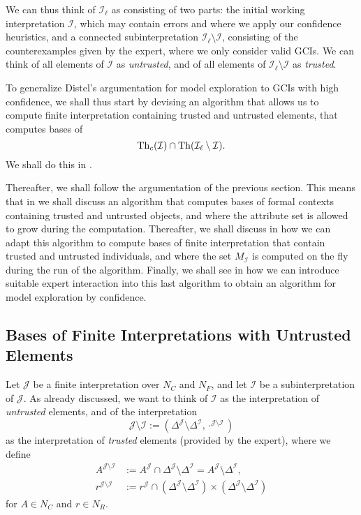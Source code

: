 We can thus think of $\mathcal{I}_{\ell}$ as consisting of two parts: the initial working
interpretation $\mathcal{I}$, which may contain errors and where we apply our confidence
heuristics, and a connected subinterpretation $\mathcal{I}_{\ell} \setminus \mathcal{I}$,
consisting of the counterexamples given by the expert, where we only consider valid GCIs.
We can think of all elements of $\mathcal{I}$ as \emph{untrusted}, and of all elements of
$\mathcal{I}_{\ell} \setminus \mathcal{I}$ as \emph{trusted}.

To generalize Distel's argumentation for model exploration to GCIs with high confidence,
we shall thus start by devising an algorithm that allows us to compute finite
interpretation containing trusted and untrusted elements, \ie that computes bases of
\begin{equation*}
  \operatorname{Th}_{c}(\mathcal{I}) \cap \operatorname{Th}(\mathcal{I}_{\ell} \setminus \mathcal{I}).
\end{equation*}
We shall do this in .

Thereafter, we shall follow the argumentation of the previous section.  This means that in
 we shall discuss an algorithm that computes bases of formal
contexts containing trusted and untrusted objects, and where the attribute set is allowed
to grow during the computation.  Thereafter, we shall discuss in
 how we can adapt this algorithm to compute bases of finite
interpretation that contain trusted and untrusted individuals, and where the set
$M_{\mathcal{I}}$ is computed on the fly during the run of the algorithm.  Finally, we
shall see in  how we can introduce suitable expert interaction
into this last algorithm to obtain an algorithm for model exploration by confidence.

\subsection{Bases of Finite Interpretations with Untrusted Elements}
\label{sec:trust-untr-indiv}

Let $\mathcal{J}$ be a finite interpretation over $N_{C}$ and $N_{F}$, and let
$\mathcal{I}$ be a subinterpretation of $\mathcal{J}$.  As already discussed, we want to
think of $\mathcal{I}$ as the interpretation of \emph{untrusted} elements, and of the
interpretation
\begin{equation*}
  \mathcal{J} \setminus \mathcal{I} := (\Delta^{\mathcal{J}} \setminus
  \Delta^{\mathcal{I}}, \cdot^{\mathcal{J} \setminus \mathcal{I}})
\end{equation*}
as the interpretation of \emph{trusted} elements (provided by the expert), where we define
\begin{align*}
  A^{\mathcal{J} \setminus \mathcal{I}} &:= A^{\mathcal{J}} \cap \Delta^{\mathcal{J}}
  \setminus \Delta^{\mathcal{I}} = A^{\mathcal{J}} \setminus \Delta^{\mathcal{I}},\\
  r^{\mathcal{J} \setminus \mathcal{I}} &:= r^{\mathcal{J}} \cap (\Delta^{\mathcal{J}}
  \setminus \Delta^{\mathcal{I}}) \times (\Delta^{\mathcal{J}} \setminus \Delta^{\mathcal{I}})
\end{align*}
for $A \in N_{C}$ and $r \in N_{R}$.

